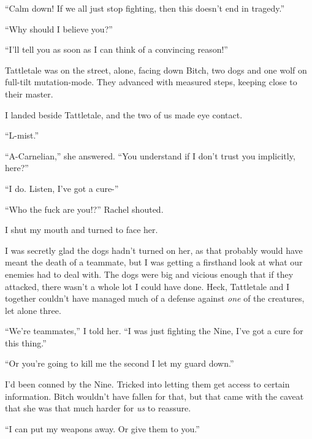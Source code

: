 ``Calm down!  If we all just stop fighting, then this doesn't end in tragedy.''



``Why should I believe you?''



``I'll tell you as soon as I can think of a convincing reason!''



Tattletale was on the street, alone, facing down Bitch, two dogs and one wolf on full-tilt mutation-mode.  They advanced with measured steps, keeping close to their master.



I landed beside Tattletale, and the two of us made eye contact.



``L-mist.''



``A-Carnelian,'' she answered.  ``You understand if I don't trust you implicitly, here?''



``I do.  Listen, I've got a cure-''



``Who the fuck are you!?''  Rachel shouted.



I shut my mouth and turned to face her.



I was secretly glad the dogs hadn't turned on her, as that probably would have meant the death of a teammate, but I was getting a firsthand look at what our enemies had to deal with.  The dogs were big and vicious enough that if they attacked, there wasn't a whole lot I could have done.  Heck, Tattletale and I together couldn't have managed much of a defense against \emph{one }of the creatures, let alone three.



``We're teammates,'' I told her.  ``I was just fighting the Nine, I've got a cure for this thing.''



``Or you're going to kill me the second I let my guard down.''



I'd been conned by the Nine.  Tricked into letting them get access to certain information.  Bitch wouldn't have fallen for that, but that came with the caveat that she was that much harder for \emph{us} to reassure.



``I can put my weapons away.  Or give them to you.''



